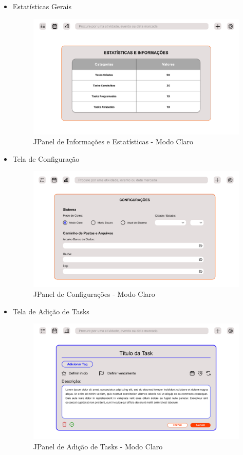\documentclass[a4paper,12pt]{article}
\begin{document}
\begin{itemize}
	\item Estatísticas Gerais
	\begin{figure}[H]
		\centering
		\includegraphics[scale=0.20]{prototypes/white/Stats Panel Window.png}
		\caption{JPanel de Informações e Estatísticas - Modo Claro}
	\end{figure}

	\item Tela de Configuração
	\begin{figure}[H]
		\centering
		\includegraphics[scale=0.20]{prototypes/white/Config Panel Window.png}
		\caption{JPanel de Configurações - Modo Claro}
	\end{figure}

	\item Tela de Adição de Tasks
	\begin{figure}[H]
		\centering
		\includegraphics[scale=0.20]{prototypes/white/Add Task Panel Window.png}
		\caption{JPanel de Adição de Tasks - Modo Claro}
	\end{figure}


\end{itemize}
\end{document}
